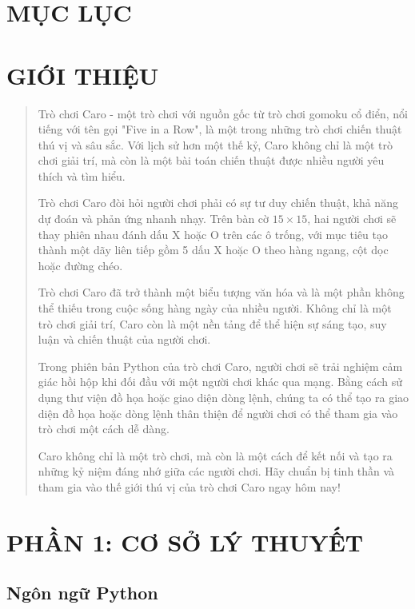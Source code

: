 \documentclass[a4paper]{article}
\begin{document}
\thispagestyle{empty}

\newpage
\section*{MỤC LỤC}
\tableofcontents
\newpage
\section*{GIỚI THIỆU}

\begin{quotation}
Trò chơi Caro - một trò chơi với nguồn gốc từ trò chơi gomoku cổ điển, nổi tiếng với tên gọi "Five in a Row", là một trong những trò chơi chiến thuật thú vị và sâu sắc. Với lịch sử hơn một thế kỷ, Caro không chỉ là một trò chơi giải trí, mà còn là một bài toán chiến thuật được nhiều người yêu thích và tìm hiểu.

Trò chơi Caro đòi hỏi người chơi phải có sự tư duy chiến thuật, khả năng dự đoán và phản ứng nhanh nhạy. Trên bàn cờ $15 \times 15$, hai người chơi sẽ thay phiên nhau đánh dấu X hoặc O trên các ô trống, với mục tiêu tạo thành một dãy liên tiếp gồm 5 dấu X hoặc O theo hàng ngang, cột dọc hoặc đường chéo.

Trò chơi Caro đã trở thành một biểu tượng văn hóa và là một phần không thể thiếu trong cuộc sống hàng ngày của nhiều người. Không chỉ là một trò chơi giải trí, Caro còn là một nền tảng để thể hiện sự sáng tạo, suy luận và chiến thuật của người chơi.

Trong phiên bản Python của trò chơi Caro, người chơi sẽ trải nghiệm cảm giác hồi hộp khi đối đầu với một người chơi khác qua mạng. Bằng cách sử dụng thư viện đồ họa hoặc giao diện dòng lệnh, chúng ta có thể tạo ra giao diện đồ họa hoặc dòng lệnh thân thiện để người chơi có thể tham gia vào trò chơi một cách dễ dàng.

Caro không chỉ là một trò chơi, mà còn là một cách để kết nối và tạo ra những kỷ niệm đáng nhớ giữa các người chơi. Hãy chuẩn bị tinh thần và tham gia vào thế giới thú vị của trò chơi Caro ngay hôm nay!
\end{quotation}

\newpage

\section*{PHẦN 1: CƠ SỞ LÝ THUYẾT}
\setcounter{section}{1}
\subsection{Ngôn ngữ Python}
\end{document}
